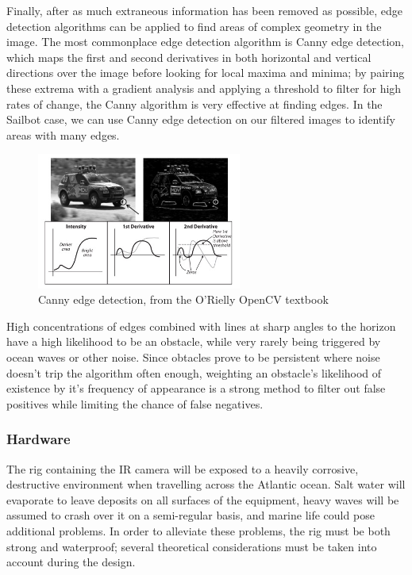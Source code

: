 Finally, after as much extraneous information has been removed as possible, edge detection algorithms can be applied to find areas of complex geometry in the image. The most commonplace edge detection algorithm is Canny edge detection, which maps the first and second derivatives in both horizontal and vertical directions over the image before looking for local maxima and minima; by pairing these extrema with a gradient analysis and applying a threshold to filter for high rates of change, the Canny algorithm is very effective at finding edges. In the Sailbot case, we can use Canny edge detection on our filtered images to identify areas with many edges. 
\begin{figure}
\centering
\includegraphics[width=0.6\textwidth]{"./image/canny"}
\caption{Canny edge detection, from the O'Rielly OpenCV textbook}
\label{fig:canny}
\end{figure}

High concentrations of edges combined with lines at sharp angles to the horizon have a high likelihood to be an obstacle, while very rarely being triggered by ocean waves or other noise. Since obtacles prove to be persistent where noise doesn't trip the algorithm often enough, weighting an obstacle's likelihood of existence by it's frequency of appearance is a strong method to filter out false positives while limiting the chance of false negatives.


\subsubsection{\label{sec:discussion:theory:righardware}Hardware}

The rig containing the IR camera will be exposed to a heavily corrosive, destructive environment when travelling across the Atlantic ocean. Salt water will evaporate to leave deposits on all surfaces of the equipment, heavy waves will be assumed to crash over it on a semi-regular basis, and marine life could pose additional problems. In order to alleviate these problems, the rig must be both strong and waterproof; several theoretical considerations must be taken into account during the design.

